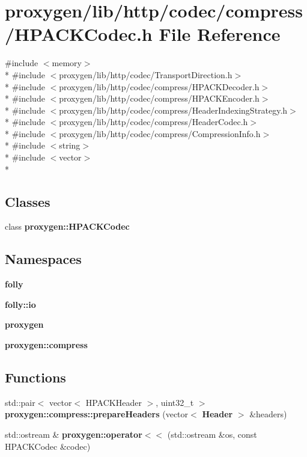 \section{proxygen/lib/http/codec/compress/\+H\+P\+A\+C\+K\+Codec.h File Reference}
\label{HPACKCodec_8h}
{\ttfamily \#include $<$memory$>$}\\*
{\ttfamily \#include $<$proxygen/lib/http/codec/\+Transport\+Direction.\+h$>$}\\*
{\ttfamily \#include $<$proxygen/lib/http/codec/compress/\+H\+P\+A\+C\+K\+Decoder.\+h$>$}\\*
{\ttfamily \#include $<$proxygen/lib/http/codec/compress/\+H\+P\+A\+C\+K\+Encoder.\+h$>$}\\*
{\ttfamily \#include $<$proxygen/lib/http/codec/compress/\+Header\+Indexing\+Strategy.\+h$>$}\\*
{\ttfamily \#include $<$proxygen/lib/http/codec/compress/\+Header\+Codec.\+h$>$}\\*
{\ttfamily \#include $<$proxygen/lib/http/codec/compress/\+Compression\+Info.\+h$>$}\\*
{\ttfamily \#include $<$string$>$}\\*
{\ttfamily \#include $<$vector$>$}\\*
\subsection*{Classes}
\begin{DoxyCompactItemize}
\item 
class {\bf proxygen\+::\+H\+P\+A\+C\+K\+Codec}
\end{DoxyCompactItemize}
\subsection*{Namespaces}
\begin{DoxyCompactItemize}
\item 
 {\bf folly}
\item 
 {\bf folly\+::io}
\item 
 {\bf proxygen}
\item 
 {\bf proxygen\+::compress}
\end{DoxyCompactItemize}
\subsection*{Functions}
\begin{DoxyCompactItemize}
\item 
std\+::pair$<$ vector$<$ H\+P\+A\+C\+K\+Header $>$, uint32\+\_\+t $>$ {\bf proxygen\+::compress\+::prepare\+Headers} (vector$<$ {\bf Header} $>$ \&headers)
\item 
std\+::ostream \& {\bf proxygen\+::operator$<$$<$} (std\+::ostream \&os, const H\+P\+A\+C\+K\+Codec \&codec)
\end{DoxyCompactItemize}
